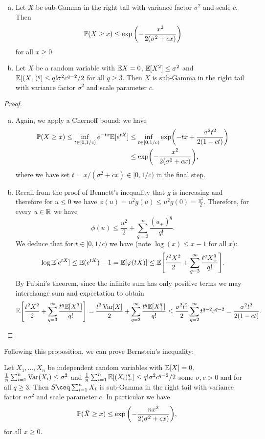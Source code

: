 \begin{proposition}
\begin{enumerate}[(a)]
\item Let $X$ be sub-Gamma in the right tail with variance factor $\sigma^2$ and scale $c$. Then 
\[
\mathbb P(X \geq x) \leq \exp\qty(-\frac{x^2}{2(\sigma^2 + cx)})
\]
for all $x \geq 0$.

\item Let $X$ be a random variable with $\mathbb E X = 0$, $\mathbb E[X^2] \leq \sigma^2$ and $\mathbb E[(X_+)^q] \leq q! \sigma^2 c^{q-2}/2$ for all $q \geq 3$. Then $X$ is sub-Gamma in the right tail with variance factor $\sigma^2$ and scale parameter $c$. 
\end{enumerate}
\end{proposition}

\begin{proof}
\begin{enumerate}[(a)]
\item Again, we apply a Chernoff bound: we have
\begin{align*}
\mathbb P(X \geq x) \leq \inf_{t \in [0, 1/c)} e^{-tx} \mathbb E[e^{tX}] &\leq \inf_{t \in [0, 1/c)} \exp(-tx + \frac{\sigma^2t^2}{2(1 - ct)}) \\
&\leq \exp(- \frac{x^2}{2(\sigma^2 + cx)}),
\end{align*}
where we have set $t = x/(\sigma^2 + cx) \in [0, 1/c)$ in the final step. 

\item Recall from the proof of Bennett's inequality that $g$ is increasing and therefore for $u \leq 0$ we have $\phi(u) = u^2 g(u) \leq u^2 g(0) = \frac{u^2}{2}$. Therefore, for every $u \in \mathbb R$ we have
\[
\phi(u) \leq \frac{u^2}{2} + \sum_{q=3}^\infty \frac{(u_+)^q}{q!}.
\]
We deduce that for $t \in [0, 1/c)$ we have (note $\log(x) \leq x - 1$ for all $x$):
\[
\log \mathbb E[e^{tX}] \leq \mathbb E(e^{tX}) - 1 = \mathbb E[\varphi(tX)] \leq \mathbb E \qty[\frac{t^2X^2}{2} + \sum_{q=3}^\infty \frac{t^q X_+^q}{q!}].
\]
By Fubini's theorem, since the infinite sum has only positive terms we may interchange sum and expectation to obtain
\[
\mathbb E \qty[\frac{t^2X^2}{2} + \sum_{q=3}^\infty \frac{t^q \mathbb E[X_+^q]}{q!}] =  \frac{t^2 \operatorname{Var}[X]}{2} + \sum_{q=3}^\infty \frac{t^q \mathbb E[X_+^q]}{q!} \leq \frac{\sigma^2 t^2}{2} \sum_{q=2}^\infty t^{q-2} c^{q-2} = \frac{\sigma^2t^2}{2(1-ct)}. 
\]
\end{enumerate}
\end{proof}

Following this proposition, we can prove Bernstein's inequality:
\begin{theorem}
	Let $X_1, \dotsc, X_n$ be independent random variables with $\mathbb E[X] = 0$, $\frac1n\sum_{i=1}^n \operatorname{Var}(X_i) \leq \sigma^2$ and $\frac1n \sum_{i=1}^n \mathbb E[(X_i)_+^q] \leq q! \sigma^2 c^{q-2}/2$ some $\sigma, c > 0$ and for all $q \geq 3$. Then $S \ceq \sum_{i=1}^n X_i$ is sub-Gamma in the right tail with variance factor $n\sigma^2$ and scale parameter $c$. In particular we have
	\[
	\mathbb P(\bar X \geq x) \leq \exp\qty(- \frac{nx^2}{2(\sigma^2 + cx)}),
	\]
	for all $x \geq 0$. 
\end{theorem}

